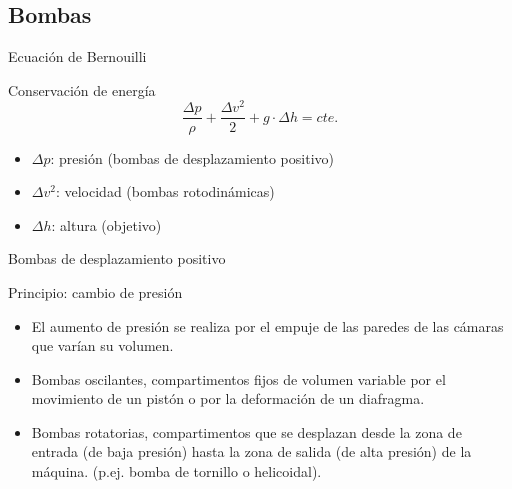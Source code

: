 \documentclass[xcolor={usenames,svgnames,dvipsnames}]{beamer}
\begin{document}
\subsection{Bombas}
\label{sec:org58748f9}

\begin{frame}[label={sec:orgd09b707}]{Ecuación de Bernouilli}
\begin{block}{Conservación de energía}
$$\frac{\Delta p}{\rho}+\frac{\Delta v^2}{2}+g\cdot\Delta h=cte.$$
\begin{itemize}
\item \(\Delta p\): presión (bombas de desplazamiento positivo)
\item \(\Delta v^2\): velocidad (bombas rotodinámicas)
\item \(\Delta h\): altura (objetivo)
\end{itemize}
\end{block}
\end{frame}


\begin{frame}[label={sec:orge68a092}]{Bombas de desplazamiento positivo}
\begin{block}{\alert{Principio}: cambio de presión}
\begin{itemize}
\item El aumento de presión se realiza por el empuje de las paredes de las cámaras que varían su volumen.

\item \alert{Bombas oscilantes}, compartimentos fijos de volumen variable por el movimiento de un pistón o por la deformación de un diafragma.

\item \alert{Bombas rotatorias}, compartimentos que se desplazan desde la zona de entrada (de baja presión) hasta la zona de salida (de alta presión) de la máquina. (p.ej. bomba de tornillo o helicoidal).
\end{itemize}
\end{block}
\end{frame}
\end{document}
